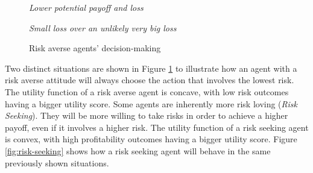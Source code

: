 \begin{figure}[H]
    \centering
    \begin{minipage}{.5\textwidth}
      \centering
        
        \textit{Lower potential payoff and loss}
    \end{minipage}%
    \begin{minipage}{.5\textwidth}
      \centering
        
        \textit{Small loss over an unlikely very big loss}
    \end{minipage}
    \caption{Risk averse agents' decision-making}
    \label{fig:risk-averse}
\end{figure}

Two distinct situations are shown in Figure \ref{fig:risk-averse} to illustrate how an agent with a risk averse attitude will always choose the action that involves the lowest risk. The utility function of a risk averse agent is concave, with low risk outcomes having a bigger utility score. Some agents are inherently more risk loving (\textit{Risk Seeking}). They will be more willing to take risks in order to achieve a higher payoff, even if it involves a higher risk. The utility function of a risk seeking agent is convex, with high profitability outcomes having a bigger utility score. Figure \ref{fig:risk-seeking} shows how a risk seeking agent will behave in the same previously shown situations.

